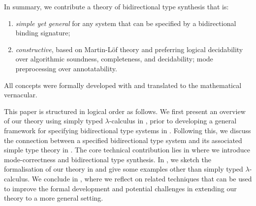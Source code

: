 In summary, we contribute a theory of bidirectional type synthesis that is:
\begin{enumerate}
  \item \emph{simple yet general} for any system that can be specified by a bidirectional binding signature;
  \item \emph{constructive}, based on Martin-L\"of theory and preferring logical decidability over algorithmic soundness, completeness, and decidability; mode preprocessing over annotatability.
\end{enumerate}
All concepts were formally developed with \Agda and translated to the mathematical vernacular. 

This paper is structured in logical order as follows.
We first present an overview of our theory using simply typed $\lambda$-calculus in , prior to developing a general framework for specifying bidirectional type systems in .
Following this, we discuss the connection between a specified bidirectional type system and its associated simple type theory in .
The core technical contribution lies in  where we introduce mode-correctness and bidirectional type synthesis.
In , we sketch the formalisation of our theory in \Agda and give some examples other than simply typed $\lambda$-calculus.
We conclude in , where we reflect on related techniques that can be used to improve the formal development and potential challenges in extending our theory to a more general setting.

